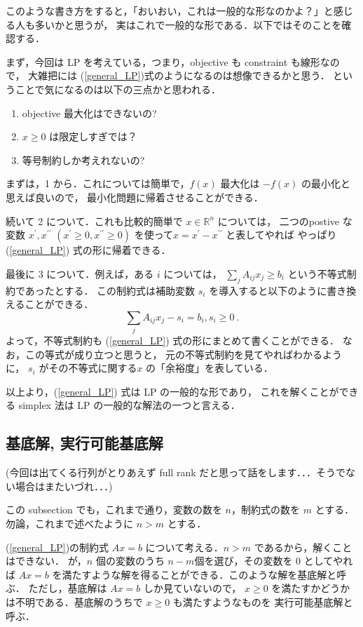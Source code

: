 \documentclass[11pt, a4]{article}
\begin{document}
このような書き方をすると，「おいおい，これは一般的な形なのかよ？」と感じる人も多いかと思うが，
実はこれで一般的な形である．以下ではそのことを確認する．

まず，今回は LP を考えている，つまり，objective も constraint も線形なので，
大雑把には (\ref{general_LP})式のようになるのは想像できるかと思う．
ということで気になるのは以下の三点かと思われる．
\begin{enumerate}
\item objective 最大化はできないの?
\item $x \geq 0$ は限定しすぎでは？
\item 等号制約しか考えれないの?  
\end{enumerate}

まずは，1 から．これについては簡単で，$f(x)$ 最大化は $-f(x)$ の最小化と思えば良いので，
最小化問題に帰着させることができる．

続いて 2 について．これも比較的簡単で $x \in \mathbb{R}^n$ については，
二つのpostive な変数 $x^{\prime}, x^{\prime \prime}$ $(x^{\prime} \geq 0, x^{\prime\prime}\geq 0)$
を使って$x = x^{\prime} - x^{\prime\prime}$ と表してやれば
やっぱり (\ref{general_LP}) 式の形に帰着できる．

最後に 3 について．例えば，ある $i$ については，
$\sum_j A_{ij} x_j \geq b_i$ という不等式制約であったとする．
この制約式は補助変数 $s_i$ を導入すると以下のように書き換えることができる．
\begin{equation}
  \sum_j A_{ij} x_j - s_i = b_i, s_i \geq 0\ .
\end{equation}
よって，不等式制約も (\ref{general_LP}) 式の形にまとめて書くことができる．
なお，この等式が成り立つと思うと，
元の不等式制約を見てやればわかるように，
$s_i$ がその不等式に関する$x$ の「余裕度」を表している．


以上より，(\ref{general_LP}) 式は LP の一般的な形であり，
これを解くことができる simplex 法は LP の一般的な解法の一つと言える．

\subsection{基底解, 実行可能基底解}
(今回は出てくる行列がとりあえず full rank だと思って話をします．．．そうでない場合はまたいづれ．．．)

この subsection でも，これまで通り，変数の数を $n$，制約式の数を $m$ とする．
勿論，これまで述べたように $n > m$ とする．

(\ref{general_LP})の制約式 $Ax = b$ について考える．$n > m$ であるから，解くことはできない．
が，$n$ 個の変数のうち $n - m$個を選び，その変数を $0$ としてやれば $Ax = b$ を満たすような解を得ることができる．このような解を基底解と呼ぶ．
ただし，基底解は $Ax = b$ しか見ていないので，
$x \geq 0$ を満たすかどうかは不明である．基底解のうちで $x \geq 0$ も満たすようなものを
実行可能基底解と呼ぶ．
\end{document}
